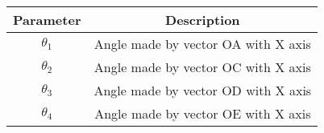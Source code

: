
\begin{center}
\begin{tabular}{|c|c|}
\hline
\textbf{Parameter}& \textbf{Description}\\ \hline
$\theta_1$	&Angle made by vector OA with X axis\\ \hline
$\theta_2$	&Angle made by vector OC with X axis\\ \hline
$\theta_3$	&Angle made by vector OD with X axis\\ \hline
$\theta_4$	&Angle made by vector OE with X axis\\ \hline
\end{tabular}
\end{center}
